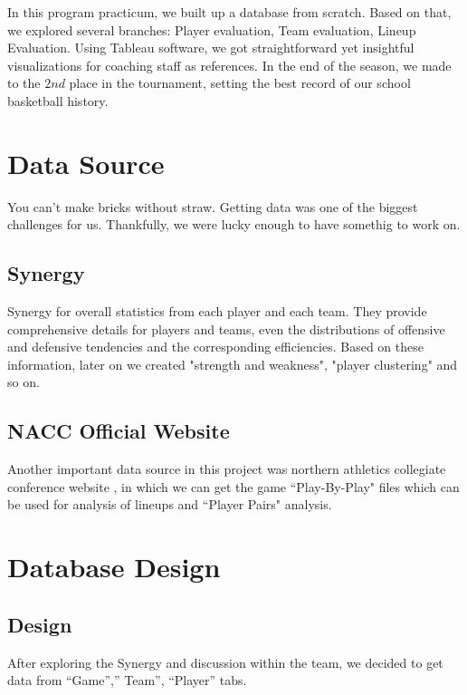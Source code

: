 \documentclass[conference]{IEEEtran}
\begin{document}
In this program practicum, we built up a database from scratch. Based on that, we explored several branches: Player evaluation, Team evaluation, Lineup Evaluation. Using Tableau software, we got straightforward yet insightful visualizations for coaching staff as references. In the end of the season, we made to the $2nd$ place in the tournament, setting the best record of our school basketball history.

\section{Data Source}
You can't make bricks without straw. Getting data was one of the biggest challenges for us. Thankfully, we were lucky enough to have somethig to work on.
\subsection{Synergy} 
Synergy\cite{synergy} for overall statistics from each player and each team. They provide comprehensive details for players and teams, even the distributions of offensive and defensive tendencies and the corresponding efficiencies. Based on these information, later on we created "strength and weakness", "player clustering" and so on.

\subsection{NACC Official Website}
Another important data source in this project was northern athletics collegiate conference website \cite{nacc}, in which we can get the game ``Play-By-Play" files which can be used for analysis of lineups and ``Player Pairs" analysis.

\section{Database Design}

\subsection{Design}
After exploring the Synergy and discussion within the team, we decided to get data from “Game”,” Team”, “Player” tabs.
\end{document}
